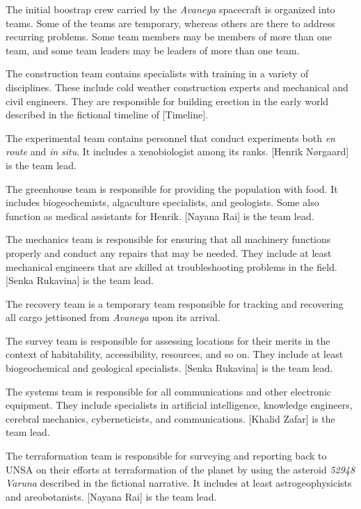 

The initial boostrap crew carried by the {\it Avaneya} spacecraft is organized into teams. Some of the teams are temporary, whereas others are there to address recurring problems. Some team members may be members of more than one team, and some team leaders may be leaders of more than one team.

The construction team contains specialists with training in a variety of disciplines. These include cold weather construction experts and mechanical and civil engineers. They are responsible for building erection in the early world described in the fictional timeline of [Timeline].

The experimental team contains personnel that conduct experiments both {\it en route} and {\it in situ}. It includes a xenobiologist among its ranks. [Henrik Nørgaard] is the team lead.

The greenhouse team is responsible for providing the population with food. It includes biogeochemists, algaculture specialists, and geologists. Some also function as medical assistants for Henrik. [Nayana Rai] is the team lead.

The mechanics team is responsible for ensuring that all machinery functions properly and conduct any repairs that may be needed. They include at least mechanical engineers that are skilled at troubleshooting problems in the field. [Senka Rukavina] is the team lead.

The recovery team is a temporary team responsible for tracking and recovering all cargo jettisoned from {\it Avaneya} upon its arrival.

The survey team is responsible for assessing locations for their merits in the context of habitability, accessibility, resources, and so on. They include at least biogeochemical and geological specialists. [Senka Rukavina] is the team lead.

The systems team is responsible for all communications and other electronic equipment. They include specialists in artificial intelligence, knowledge engineers, cerebral mechanics, cyberneticists, and communications. [Khalid Zafar] is the team lead.

The terraformation team is responsible for surveying and reporting back to UNSA on their efforts at terraformation of the planet by using the asteroid {\it 52948 Varuna} described in the fictional narrative. It includes at least astrogeophysicists and areobotanists. [Nayana Rai] is the team lead.

